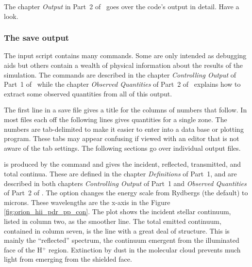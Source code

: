 \documentclass[12pt,twoside]{article}
\begin{document}
The chapter \emph{Output} in Part~2 of \Hazy\ goes over
the code's output in detail.
Have a look.

\subsubsection{The save output}

The input script contains many 
commands.  Some are only intended
as debugging aids but others contain a wealth of physical information about
the results of the simulation.  The 
commands are described in the
chapter \emph{Controlling Output} of Part~1
of \Hazy\ while the chapter
\emph{Observed Quantities} of Part~2 of \Hazy\ explains
how to extract some observed quantities
from all of this output.

The first line in a save file gives a title for the columns of numbers
that follow.
In most files each off the following lines gives quantities for a single zone.
The numbers are tab-delimited to make it easier to enter into a data base
or plotting program.  These tabs may appear confusing if viewed with an
editor that is not aware of the tab settings.  The following sections go
over individual output files.

 is produced
by the  command and gives
the incident, reflected, transmitted, and total continua.  These are defined
in the chapter \emph{Definitions} of Part~1,
and are described in both chapters
\emph{Controlling Output} of Part~1 and
\emph{Observed Quantities} of Part~2 of \Hazy.
The  option changes the energy
scale from Rydbergs (the default) to
microns.
These wavelengths are the x-axis in the
Figure \ref{fig:orion_hii_pdr_pp_con}.
The
plot shows the incident stellar continuum, listed in column two, as the
smoother line.  The total emitted continuum, contained in column seven,
is the line with a great deal of structure.  This is mainly the ``reflected''
spectrum, the continuum emergent from the
illuminated face of the H$^+$ region.
Extinction by dust in the molecular cloud prevents much light from emerging
from the shielded face.
\end{document}
